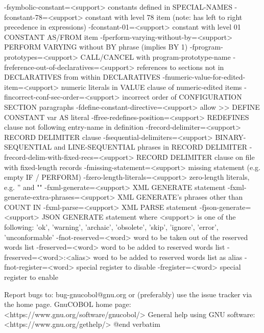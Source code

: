   -fsymbolic-constant=<support>	constants defined in SPECIAL-NAMES
  -fconstant-78=<support>	constant with level 78 item (note: has left to right precedence in expressions)
  -fconstant-01=<support>	constant with level 01 CONSTANT AS/FROM item
  -fperform-varying-without-by=<support>	PERFORM VARYING without BY phrase (implies BY 1)
  -fprogram-prototypes=<support>	CALL/CANCEL with program-prototype-name
  -freference-out-of-declaratives=<support>	references to sections not in DECLARATIVES from within DECLARATIVES
  -fnumeric-value-for-edited-item=<support>	numeric literals in VALUE clause of numeric-edited items
  -fincorrect-conf-sec-order=<support>	incorrect order of CONFIGURATION SECTION paragraphs
  -fdefine-constant-directive=<support>	allow >> DEFINE CONSTANT var AS literal
  -ffree-redefines-position=<support>	REDEFINES clause not following entry-name in definition
  -frecord-delimiter=<support>	RECORD DELIMITER clause
  -fsequential-delimiters=<support>	BINARY-SEQUENTIAL and LINE-SEQUENTIAL phrases in RECORD DELIMITER
  -frecord-delim-with-fixed-recs=<support>	RECORD DELIMITER clause on file with fixed-length records
  -fmissing-statement=<support>	missing statement (e.g. empty IF / PERFORM)
  -fzero-length-literals=<support>	zero-length literals, e.g. '' and ""
  -fxml-generate=<support>	XML GENERATE statement
  -fxml-generate-extra-phrases=<support>	XML GENERATE's phrases other than COUNT IN
  -fxml-parse=<support>  XML PARSE statement
  -fjson-generate=<support>	JSON GENERATE statement
	where <support> is one of the following:
	'ok', 'warning', 'archaic', 'obsolete', 'skip', 'ignore', 'error', 'unconformable'
  -fnot-reserved=<word>  word to be taken out of the reserved words list
  -freserved=<word>      word to be added to reserved words list
  -freserved=<word>:<alias>	word to be added to reserved words list as alias
  -fnot-register=<word>  special register to disable
  -fregister=<word>      special register to enable


Report bugs to: bug-gnucobol@gnu.org
or (preferably) use the issue tracker via the home page.
GnuCOBOL home page: <https://www.gnu.org/software/gnucobol/>
General help using GNU software: <https://www.gnu.org/gethelp/>
@end verbatim

